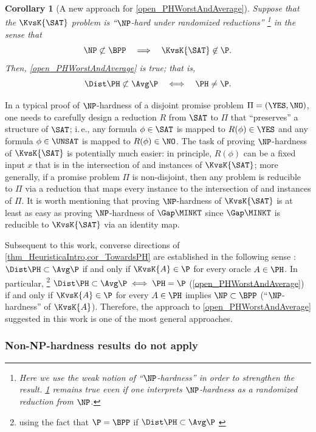 \documentclass[11pt]{article}
\numberwithin{equation}{section}
\newtheorem{corollary}[theorem]{Corollary}
\theoremstyle{definition}
\theoremstyle{plain}
\newcommand{\ie}{i.\,e.}
\begin{document}
\begin{corollary}
  [A new approach for \cref{open_PHWorstAndAverage}]
  \label{cor_TowardsPH}
  Suppose that the $\KvsK{\SAT}$ problem is ``$\NP$-hard
  under randomized reductions''%
  \footnote{
    Here we use the weak notion of ``$\NP$-hardness'' in order to strengthen the result.
    \cref{cor_TowardsPH} remains true even if one interprets $\NP$-hardness as a randomized reduction from $\NP$.
  }
  in the sense that
  $$
    \NP \not\subset \BPP
    \quad
    \Longrightarrow
    \quad
    \KvsK{\SAT} \not\in \P.
  $$
  Then,
  \cref{open_PHWorstAndAverage} is true; that is,
  $$
    \Dist\PH \not\subset \Avg\P
    \quad
    \Longleftrightarrow
    \quad
    \PH \neq \P.
  $$
\end{corollary}

In a typical proof of $\NP$-hardness of a disjoint promise problem $\Pi = (\YES, \NO)$,
one needs to carefully design
a reduction $R$ from $\SAT$ to $\Pi$
that ``preserves'' a structure of $\SAT$;
\ie,
any formula $\phi \in \SAT$ is mapped to $R(\phi) \in \YES$
and
any formula $\phi \in \UNSAT$ is mapped to $R(\phi) \in \NO$.
The task of proving $\NP$-hardness of $\KvsK{\SAT}$
is potentially much easier:
in principle, $R(\phi)$ can be a fixed input $x$ that is in the intersection of
\Yes and \No instances of $\KvsK{\SAT}$;
more generally, if a promise problem $\Pi$ is non-disjoint,
then any problem is reducible to $\Pi$ via a reduction that maps every instance
to the intersection of \Yes and \No instances of $\Pi$.
%
%
%
%
%
%
%
%
%
%
%
%
It is worth mentioning that
proving $\NP$-hardness of $\KvsK{\SAT}$
is at least as easy as proving $\NP$-hardness of $\Gap\MINKT$
since
$\Gap\MINKT$ is reducible to $\KvsK{\SAT}$ via an identity map.
%
%
%
%

Subsequent to this work, converse directions of \cref{thm_HeuristicaIntro,cor_TowardsPH} are established in the following sense \cite{Hirahara20_focs_conf}:
$\Dist\PH \subset \Avg\P$ if and only if $\KvsK{A} \in \P$ for every oracle $A \in \PH$.
In particular,%
\footnote{using the fact that $\P = \BPP$ if $\Dist\PH \subset \Avg\P$ \cite{BuhrmanFP05_mst_journals}}
$\Dist\PH \subset \Avg\P \iff \PH = \P$ (\cref{open_PHWorstAndAverage}) if and only if $\KvsK{A} \in \P$ for every $A \in \PH$ implies $\NP \subset \BPP$
(``$\NP$-hardness'' of $\KvsK{A}$).
Therefore, the approach to \cref{open_PHWorstAndAverage} suggested in this work
is one of the most general approaches.

\subsubsection{Non-NP-hardness results do not apply}
\end{document}
